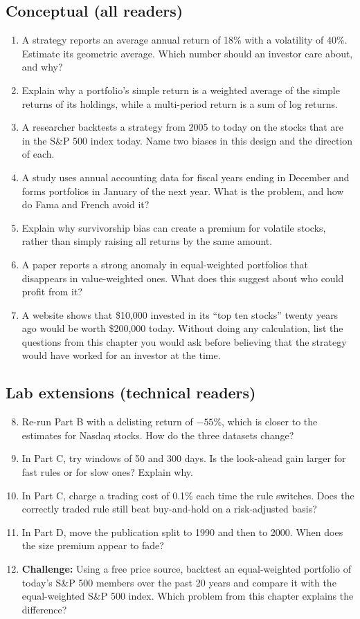 \subsection*{Conceptual (all readers)}

\begin{enumerate}
  \item A strategy reports an average annual return of 18\% with a volatility of 40\%. Estimate its geometric average. Which number should an investor care about, and why?
  \item Explain why a portfolio's simple return is a weighted average of the simple returns of its holdings, while a multi-period return is a sum of log returns.
  \item A researcher backtests a strategy from 2005 to today on the stocks that are in the S\&P 500 index today. Name two biases in this design and the direction of each.
  \item A study uses annual accounting data for fiscal years ending in December and forms portfolios in January of the next year. What is the problem, and how do Fama and French avoid it?
  \item Explain why survivorship bias can create a premium for volatile stocks, rather than simply raising all returns by the same amount.
  \item A paper reports a strong anomaly in equal-weighted portfolios that disappears in value-weighted ones. What does this suggest about who could profit from it?
  \item A website shows that \$10,000 invested in its ``top ten stocks'' twenty years ago would be worth \$200,000 today. Without doing any calculation, list the questions from this chapter you would ask before believing that the strategy would have worked for an investor at the time.
\end{enumerate}

\subsection*{Lab extensions (technical readers)}

\begin{enumerate}
  \setcounter{enumi}{7}
  \item Re-run Part B with a delisting return of $-55$\%, which is closer to the estimates for Nasdaq stocks. How do the three datasets change?
  \item In Part C, try windows of 50 and 300 days. Is the look-ahead gain larger for fast rules or for slow ones? Explain why.
  \item In Part C, charge a trading cost of 0.1\% each time the rule switches. Does the correctly traded rule still beat buy-and-hold on a risk-adjusted basis?
  \item In Part D, move the publication split to 1990 and then to 2000. When does the size premium appear to fade?
  \item \textbf{Challenge:} Using a free price source, backtest an equal-weighted portfolio of today's S\&P 500 members over the past 20 years and compare it with the equal-weighted S\&P 500 index. Which problem from this chapter explains the difference?
\end{enumerate}
